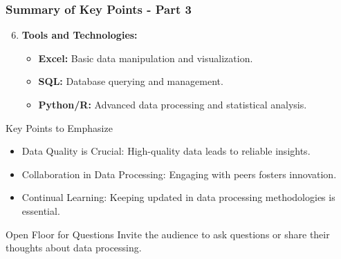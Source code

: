 \documentclass[aspectratio=169]{beamer}
\begin{document}
\begin{frame}[fragile]
    \frametitle{Summary of Key Points - Part 3}

    \begin{enumerate}
        \setcounter{enumi}{5}
        \item \textbf{Tools and Technologies:}
        \begin{itemize}
            \item \textbf{Excel:} Basic data manipulation and visualization.
            \item \textbf{SQL:} Database querying and management.
            \item \textbf{Python/R:} Advanced data processing and statistical analysis.
        \end{itemize}
    \end{enumerate}

    \begin{block}{Key Points to Emphasize}
        \begin{itemize}
            \item Data Quality is Crucial: High-quality data leads to reliable insights.
            \item Collaboration in Data Processing: Engaging with peers fosters innovation.
            \item Continual Learning: Keeping updated in data processing methodologies is essential.
        \end{itemize}
    \end{block}

    \begin{block}{Open Floor for Questions}
        Invite the audience to ask questions or share their thoughts about data processing.
    \end{block}
\end{frame}
\end{document}
